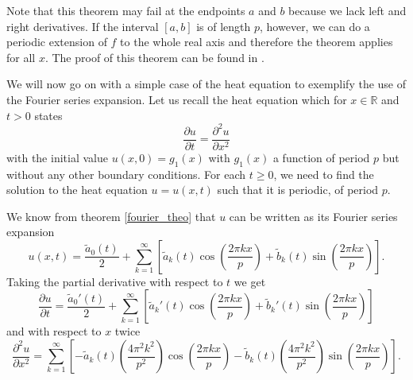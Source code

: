 \documentclass[00main.tex]{subfiles}
\begin{document}
Note that this theorem may fail at the endpoints $a$ and $b$ because we lack left and right derivatives. If the interval $[a,b]$ is of length $p$, however, we can do a periodic extension of $f$ to the whole real axis and therefore the theorem applies for all $x$. The proof of this theorem can be found in \cite{tolstov}.


%
%

We will now go on with a simple case of the heat equation to exemplify the use of the Fourier series expansion. Let us recall the heat equation which for $x\in \mathbb{R}$ and $t>0$ states \[
\frac{\partial u}{\partial t} = \frac{\partial^2 u}{\partial x^2} \] with the initial value $u (x,0) = g_1(x)$ with $g_1(x)$ a function of period $p$ but without any other boundary conditions. For each $t \geq 0$, we need to find the solution to the heat equation $u = u(x,t)$ such that it is periodic, of period $p$.

We know from theorem \ref{fourier_theo} that $u$ can be written as its Fourier series expansion \[ u(x,t) = \frac{\tilde{a}_0 (t)}{2} + \sum_{k=1}^\infty \left[ \tilde{a}_k (t) \cos \left( \frac{2\pi kx}{p} \right) + \tilde{b}_k (t) \sin \left( \frac{2\pi kx}{p} \right) \right]. \] Taking the partial derivative with respect to $t$ we get \[ \frac{\partial u}{\partial t} = \frac{\tilde{a}_0' (t)}{2} + \sum_{k=1}^\infty \left[ \tilde{a}_k' (t) \cos \left( \frac{2\pi kx}{p} \right) + \tilde{b}_k' (t) \sin \left( \frac{2\pi kx}{p} \right) \right] \] and with respect to $x$ twice \[ \frac{\partial^2 u}{\partial x^2} = \sum_{k=1}^\infty \left[ -\tilde{a}_k (t) \left(\frac{4\pi^2k^2}{p^2} \right) \cos \left( \frac{2\pi kx}{p} \right) - \tilde{b}_k (t) \left(\frac{4\pi^2k^2}{p^2} \right) \sin \left( \frac{2\pi kx}{p} \right) \right]. \]
\end{document}
